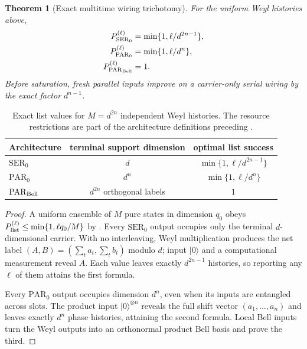 \documentclass[11pt]{article}
\newtheorem{theorem}{Theorem}[section]
\theoremstyle{definition}
\theoremstyle{remark}
\newcommand{\ket}[1]{\lvert #1\rangle}
\begin{document}
\begin{theorem}[Exact multitime wiring trichotomy]
\label{thm:weyl-wiring}
For the uniform Weyl histories above,
\begin{equation}\label{eq:weyl-trichotomy}
 \begin{aligned}
 P_{\mathrm{SER}_0}^{(\ell)}
   &=\min\{1,\ell/d^{2n-1}\},\\
 P_{\mathrm{PAR}_0}^{(\ell)}
   &=\min\{1,\ell/d^n\},\\
 P_{\mathrm{PAR}_{\rm Bell}}^{(\ell)}&=1.
 \end{aligned}
\end{equation}
Before saturation, fresh parallel inputs improve on a carrier-only serial
wiring by the exact factor $d^{n-1}$.
\end{theorem}

\begin{table}[ht]
\centering
\caption{Exact list values for $M=d^{2n}$ independent Weyl histories.  The
resource restrictions are part of the architecture definitions preceding
.}
\label{tab:weyl-wiring}
\begin{tabular}{@{}lcc@{}}
\toprule
Architecture & terminal support dimension & optimal list success\\
\midrule
$\mathrm{SER}_0$ & $d$ & $\min\{1,\ell/d^{2n-1}\}$\\
$\mathrm{PAR}_0$ & $d^n$ & $\min\{1,\ell/d^n\}$\\
$\mathrm{PAR}_{\rm Bell}$ & $d^{2n}$ orthogonal labels & $1$\\
\bottomrule
\end{tabular}
\end{table}

\begin{proof}
A uniform ensemble of $M$ pure states in dimension $q_0$ obeys
$P_{\rm list}^{(\ell)}\leq\min\{1,\ell q_0/M\}$ by
.  Every $\mathrm{SER}_0$ output occupies only the terminal
$d$-dimensional carrier.  With no interleaving, Weyl multiplication produces
the net label
$(A,B)=(\sum_ta_t,\sum_tb_t)$ modulo $d$; input $\ket0$ and a computational
measurement reveal $A$.  Each value leaves exactly $d^{2n-1}$ histories, so
reporting any $\ell$ of them attains the first formula.

Every $\mathrm{PAR}_0$ output occupies dimension $d^n$, even when its inputs
are entangled across slots.  The product input $\ket0^{\otimes n}$ reveals
the full shift vector $(a_1,\ldots,a_n)$ and leaves exactly $d^n$ phase
histories, attaining the second formula.  Local Bell inputs turn the Weyl
outputs into an orthonormal product Bell basis and prove the third.
\end{proof}
\end{document}
